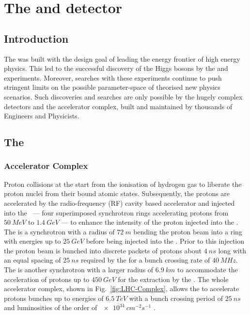 \chapter{The \LHC and \CMS detector} \label{chap:detector}


\section{Introduction}

The \LHC was built with the design goal of leading the energy frontier of high energy physics. This led to the successful discovery of the Higgs bosons by the \ATLAS \cite{Aad:1471031} and \CMS \cite{Chatrchyan:1471016} experiments.  Moreover, \BSM searches with these experiments continue to push stringent limits on the possible parameter-space of theorised new physics scenarios.  Such discoveries and searches are only possible by the hugely complex detectors and the \LHC accelerator complex, built and maintained by thousands of Engineers and Physicists.

\section{The \LHC}

\subsection{Accelerator Complex}

Proton collisions at the \LHC \cite{Bruning:782076} start from the ionisation of hydrogen gas to liberate the proton nuclei from their bound atomic states. Subsequently, the protons are accelerated by the radio-frequency (RF) cavity based accelerator \LINACTWO and injected into the \PSBooster\ --- four superimposed synchrotron rings accelerating protons from ${\SI{50}{MeV}}$ to ${\SI{1.4}{GeV}}$ --- to enhance the intensity of the proton injected into the \PS. The \PS is a synchrotron with a radius of ${\SI{72}{m}}$ bending the proton beam into a ring with energies up to ${\SI{25}{GeV}}$ before being injected into the \SPS.  Prior to this injection the proton beam is bunched into discrete packets of protons about ${\SI{4}{ns}}$ long with an equal spacing of ${\SI{25}{ns}}$ required by the \LHC for a bunch crossing rate of ${\SI{40}{MHz}}$. The \SPS is another synchrotron with a larger radius of ${\SI{6.9}{km}}$ to accommodate the acceleration of protons up to ${\SI{450}{GeV}}$ for the extraction by the \LHC. The whole accelerator complex, shown in Fig.~\ref{fig:LHC-Complex}, allows the \LHC to accelerate protons bunches up to energies of ${\SI{6.5}{TeV}}$ with a bunch crossing period of ${\SI{25}{ns}}$ and luminosities of the order of ${\SI{e34}{cm^{-2}s^{-1}}}$ \cite{Bruning:782076}.

